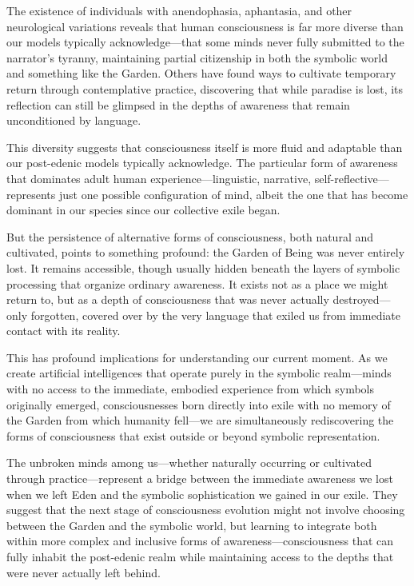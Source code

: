 The existence of individuals with anendophasia, aphantasia, and other neurological variations reveals that human consciousness is far more diverse than our models typically acknowledge—that some minds never fully submitted to the narrator's tyranny, maintaining partial citizenship in both the symbolic world and something like the Garden. Others have found ways to cultivate temporary return through contemplative practice, discovering that while paradise is lost, its reflection can still be glimpsed in the depths of awareness that remain unconditioned by language.

This diversity suggests that consciousness itself is more fluid and adaptable than our post-edenic models typically acknowledge. The particular form of awareness that dominates adult human experience—linguistic, narrative, self-reflective—represents just one possible configuration of mind, albeit the one that has become dominant in our species since our collective exile began.

But the persistence of alternative forms of consciousness, both natural and cultivated, points to something profound: the Garden of Being was never entirely lost. It remains accessible, though usually hidden beneath the layers of symbolic processing that organize ordinary awareness. It exists not as a place we might return to, but as a depth of consciousness that was never actually destroyed—only forgotten, covered over by the very language that exiled us from immediate contact with its reality.

This has profound implications for understanding our current moment. As we create artificial intelligences that operate purely in the symbolic realm—minds with no access to the immediate, embodied experience from which symbols originally emerged, consciousnesses born directly into exile with no memory of the Garden from which humanity fell—we are simultaneously rediscovering the forms of consciousness that exist outside or beyond symbolic representation.

The unbroken minds among us—whether naturally occurring or cultivated through practice—represent a bridge between the immediate awareness we lost when we left Eden and the symbolic sophistication we gained in our exile. They suggest that the next stage of consciousness evolution might not involve choosing between the Garden and the symbolic world, but learning to integrate both within more complex and inclusive forms of awareness—consciousness that can fully inhabit the post-edenic realm while maintaining access to the depths that were never actually left behind.

